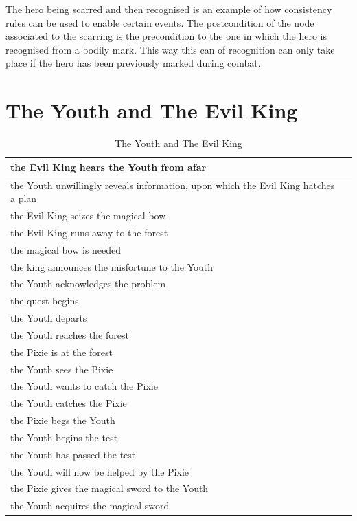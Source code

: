 \documentclass[12pt,a4paper,oneside]{report}
\begin{document}
The hero being scarred and then recognised is an example of how consistency rules can be used to enable certain events. The postcondition of the node associated to the scarring is the precondition to the one in which the hero is recognised from a bodily mark. This way this can of recognition can only take place if the hero has been previously marked during combat.


\section{The Youth and The Evil King}

\begin{longtable}[H]{| p{} | p{} |}
\caption {The Youth and The Evil King}\\
\hline
the Evil King hears the Youth from afar & \\ 
\hline
the Youth unwillingly reveals information, upon which the Evil King hatches a plan & \\
\hline
the Evil King seizes the magical bow & \\ 
\hline 
the Evil King runs away to the forest & \\ 
\hline 
the magical bow is needed  & \\ 
\hline
the king announces the misfortune to the Youth  & \\ 
\hline
the Youth acknowledges the problem  & \\ 
\hline
the quest begins  & \\ 
\hline
the Youth departs  & \\ 
\hline
the Youth reaches the forest  & \\ 
\hline
the Pixie is at the forest  & \\ 
\hline
the Youth sees the Pixie  & \\ 
\hline
the Youth wants to catch the Pixie  & \\ 
\hline
the Youth catches the Pixie  & \\ 
\hline
the Pixie begs the Youth  & \\ 
\hline
the Youth begins the test  & \\ 
\hline
the Youth has passed the test  & \\ 
\hline
the Youth will now be helped by the Pixie  & \\ 
\hline
the Pixie gives the magical sword to the Youth  & \\ 
\hline
the Youth acquires the magical sword & \\ 
\hline

\end{longtable}
\end{document}

